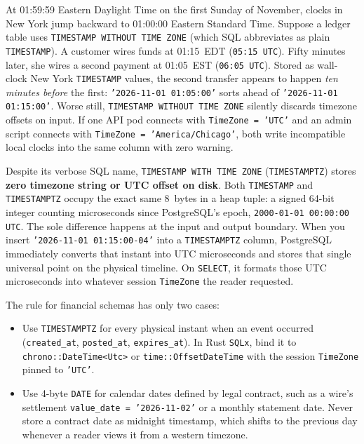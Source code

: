 At 01:59:59 Eastern Daylight Time on the first Sunday of November, clocks in New
York jump backward to 01:00:00 Eastern Standard Time. Suppose a ledger table uses
\texttt{TIMESTAMP WITHOUT TIME ZONE} (which SQL abbreviates as plain
\texttt{TIMESTAMP}). A customer wires funds at 01:15~EDT (\texttt{05:15 UTC}).
Fifty minutes later, she wires a second payment at 01:05~EST (\texttt{06:05 UTC}).
Stored as wall-clock New York \texttt{TIMESTAMP} values, the second transfer
appears to happen \emph{ten minutes before} the first: \texttt{'2026-11-01
01:05:00'} sorts ahead of \texttt{'2026-11-01 01:15:00'}. Worse still,
\texttt{TIMESTAMP WITHOUT TIME ZONE} silently discards timezone offsets on input.
If one API pod connects with \texttt{TimeZone = 'UTC'} and an admin script connects
with \texttt{TimeZone = 'America/Chicago'}, both write incompatible local clocks
into the same column with zero warning.

\begin{intuitionbox}
Despite its verbose SQL name, \texttt{TIMESTAMP WITH TIME ZONE}
(\texttt{TIMESTAMPTZ}) stores \textbf{zero timezone string or UTC offset on disk}.
Both \texttt{TIMESTAMP} and \texttt{TIMESTAMPTZ} occupy the exact same 8~bytes in
a heap tuple: a signed 64-bit integer counting microseconds since PostgreSQL's
epoch, \texttt{2000-01-01 00:00:00 UTC}. The sole difference happens at the input
and output boundary. When you insert \texttt{'2026-11-01 01:15:00-04'} into a
\texttt{TIMESTAMPTZ} column, PostgreSQL immediately converts that instant into UTC
microseconds and stores that single universal point on the physical timeline. On
\texttt{SELECT}, it formats those UTC microseconds into whatever session
\texttt{TimeZone} the reader requested.
\end{intuitionbox}

The rule for financial schemas has only two cases:
\begin{itemize}
  \item Use \texttt{TIMESTAMPTZ} for every physical instant when an event occurred
    (\texttt{created\_at}, \texttt{posted\_at}, \texttt{expires\_at}). In Rust
    \texttt{SQLx}, bind it to \texttt{chrono::DateTime<Utc>} or
    \texttt{time::OffsetDateTime} with the session \texttt{TimeZone} pinned to
    \texttt{'UTC'}.
  \item Use 4-byte \texttt{DATE} for calendar dates defined by legal contract, such
    as a wire's settlement \texttt{value\_date = '2026-11-02'} or a monthly
    statement date. Never store a contract date as midnight timestamp, which shifts
    to the previous day whenever a reader views it from a western timezone.
\end{itemize}

